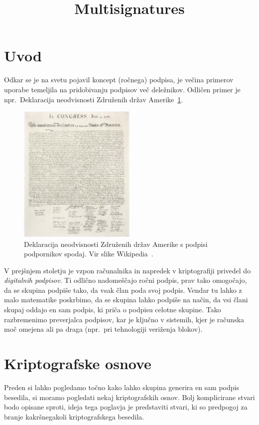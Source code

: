 \documentclass[isrm2, tisk]{fmfdelo}
\title{Multisignatures}
\begin{document}
\section{Uvod}
Odkar se je na svetu pojavil koncept (ročnega) podpisa, je večina primerov uporabe temeljila na
pridobivanju podpisov več deležnikov. Odličen primer je npr.\ Deklaracija neodvisnosti Združenih 
držav Amerike~\ref{fig:declaration}. 

\begin{figure}[h]
  \centering
  \includegraphics[width=0.5\textwidth]{images/declaration.jpg}
  \caption[Deklaracija neodvisnosti Združenih držav Amerike.]{Deklaracija neodvisnosti Združenih 
  držav Amerike s podpisi podpornikov spodaj. Vir slike Wikipedia~\cite{doi}.}
  \label{fig:declaration}
\end{figure}

V prejšnjem stoletju je vzpon računalnika in napredek v kriptografiji privedel do \textit{digitalnih
podpisov}. Ti odlično nadomeščajo ročni podpis, prav tako omogočajo, da se skupina podpiše tako, 
da vsak član poda svoj podpis. Vendar tu lahko z malo matematike poskrbimo, da se skupina lahko 
podpiše na način, da vsi člani skupaj oddajo en sam podpis, ki priča o podpisu celotne skupine. Tako 
razbremenimo preverjalca podpisov, kar je ključno v sistemih, kjer je računska moč omejena ali 
pa draga (npr.\ pri tehnologiji veriženja blokov).

\section{Kriptografske osnove}
Preden si lahko pogledamo točno kako lahko skupina generira en sam podpis besedila, si moramo 
pogledati nekaj kriptografskih osnov. Bolj komplicirane stvari bodo opisane sproti, ideja tega 
poglavja je predstaviti stvari, ki so predpogoj za branje kakršnegakoli kriptografskega 
besedila.
\end{document}
